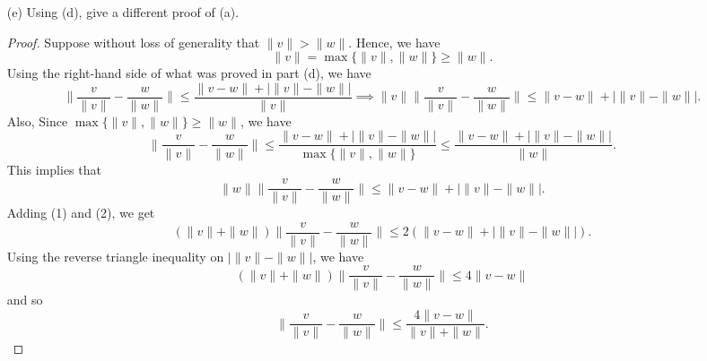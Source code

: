 \documentclass[a4paper]{article}
\begin{document}
\begin{enumerate}
\begin{proof}
        For the right-hand side of the desired inequality, we assume (without loss of generality) that \( \|v\| > \|w \| \). From the first inequality in part (a), we have
        \begin{align*}
            \Big\|\frac{ v }{ \|v\| }  - \frac{ w }{ \|w\| } \Big\| &\leq \frac{ \|v - w \| + | \|v\| - \|w\|  |  }{ \|v\| }  = \frac{ \|v - w \| + | \| v \| - \|w\| |  }{ \max \{ \|v\|, \|w\| \}  }. 
        \end{align*}
        All together, we have 
        \[  \frac{ \|v - w \| - | \|v \| - \|w \| |  }{ \min \{  \|v\|, \|w \| \}  }  \leq \Big\| \frac{ v }{ \|v\| }  - \frac{ w }{ \|w\| } \Big\| \leq \frac{ \|v - w \| + | \|v \| - \|w \| |  }{ \max \{ \|v\|, \|w\| \}  }. \]
        \end{proof}
        \item[(e)] Using (d), give a different proof of (a).
            \begin{proof}
            Suppose without loss of generality that \( \|v \| > \|w \| \). Hence, we have
            \[  \|v \| = \max \{ \|v\| , \|w\|  \} \geq \|w\|.  \]
            Using the right-hand side of what was proved in part (d), we have 
            \[  \Big\| \frac{  v }{  \|v \| }  - \frac{ w }{ \|w\| } \Big\| \leq \frac{ \|v - w \| + | \|v\| - \|w\| |  }{ \|v\|  } \implies \|v\| \Big\| \frac{ v }{ \|v\| }  - \frac{ w }{ \|w\| } \Big\| \leq \|v -w \| + | \|v\| - \|w\| |. \tag{1}  \]
            Also, Since \( \max \{ \|v\| , \|w\| \}  \geq \|w\| \), we have 
            \[  \Big\|\frac{ v }{  \|v\|  } - \frac{ w }{ \|w\| }  \Big\| \leq \frac{ \|v - w \| + | \|v\| - \|w\| |  }{ \max \{ \|v\|, \|w\| \}  } \leq \frac{ \|v - w \| + | \|v\| - \|w\| |  }{ \|w\| }. \]
            This implies that 
            \[  \|w\| \Big\| \frac{ v }{ \|v\| } - \frac{ w }{ \|w\| } \Big\| \leq \|v - w \| + | \|v\| - \|w\| |. \tag{2} \]
            Adding (1) and (2), we get
            \[  (\|v\| + \|w\|) \Big\| \frac{ v  }{ \|v\|  }  - \frac{ w }{ \|w\| } \Big\| \leq 2 (\|v  -w \| + | \|v\| - \|w\| | ). \]
            Using the reverse triangle inequality on \( | \|v \| - \|w\| |  \), we have 
            \[  (\|v\| + \|w\|) \Big\| \frac{ v }{ \|v\| }  - \frac{ w }{ \|w\| } \Big\| \leq 4 \|v - w\|  \]
            and so
            \[ \Big\| \frac{ v }{ \|v\| }  - \frac{ w }{ \|w\| }  \Big\| \leq \frac{ 4 \|v - w \| }{ \|v \| + \|w\| }. \]
            \end{proof}
\end{enumerate}
\end{document}
